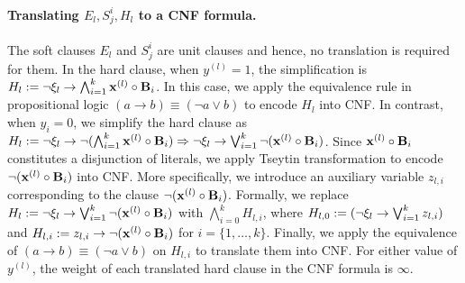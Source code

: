 \paragraph{Translating $ E_l, S^i_j, H_l $ to a CNF formula.} 
The soft clauses $ E_l $ and $ S_j^i $ are unit clauses and hence, no translation is required for them.  In the hard clause, when $ y^{(l)}=1 $, the simplification is $ H_l:= \neg \xi_l \rightarrow \bigwedge_{i=1}^k {\mathbf{x}^{(l)}} \circ {\ensuremath{\mathbf{B}}_{i}}  $. In this case, we apply the equivalence rule in propositional logic $ (a \rightarrow b) \equiv (\neg a \vee b) $  to encode $ H_l $ into  CNF. In contrast, when $ y_i=0 $, we simplify the hard clause as $ H_l:= \neg \xi_l \rightarrow \neg (\bigwedge_{i=1}^k {\mathbf{x}^{(l)}} \circ {\ensuremath{\mathbf{B}}_{i}}) \Rightarrow  \neg \xi_l \rightarrow \bigvee_{i=1}^k \neg({\mathbf{x}^{(l)}} \circ {\ensuremath{\mathbf{B}}_{i}})$. Since $ \mathbf{x}^{(l)} \circ \mathbf{B}_{i} $ constitutes a disjunction of literals, we apply Tseytin transformation to encode  $ \neg (\mathbf{x}^{(l)} \circ \mathbf{B}_{i}) $ into CNF. More specifically, we introduce an auxiliary variable $ z_{l,i} $ corresponding to the clause $ \neg ({\mathbf{x}^{(l)}} \circ {\ensuremath{\mathbf{B}}_{i}}) $. Formally, we replace $ H_l := \neg \xi_l \rightarrow  \bigvee_{i=1}^k \neg ({\mathbf{x}^{(l)}} \circ {\ensuremath{\mathbf{B}}_{i}}) $ with   $ \bigwedge_{i=0}^k H_{l,i} $,  where $ H_{l,0}:= (\neg \xi_l \rightarrow  \bigvee_{i=1}^k  z_{l,i}) $  and  $  H_{l,i}:= z_{l,i} \rightarrow  \neg({\mathbf{x}^{(l)}} \circ {\ensuremath{\mathbf{B}}_{i}})  $ for $ i=\{1,\dots,k\} $. Finally, we  apply the equivalence of $ (a \rightarrow b) \equiv (\neg a \vee b) $ on $ H_{l,i} $ to translate them into CNF. For either value of $ y^{(l)} $, the weight of each translated hard clause in the CNF formula is $ \infty $.







